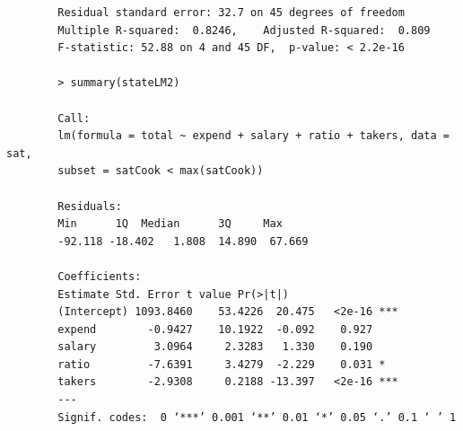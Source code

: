 \documentclass[11pt]{article}
\begin{document}
\begin{enumerate}
\begin{verbatim}
		Residual standard error: 32.7 on 45 degrees of freedom
		Multiple R-squared:  0.8246,	Adjusted R-squared:  0.809 
		F-statistic: 52.88 on 4 and 45 DF,  p-value: < 2.2e-16
		
		> summary(stateLM2)
		
		Call:
		lm(formula = total ~ expend + salary + ratio + takers, data = sat, 
		subset = satCook < max(satCook))
		
		Residuals:
		Min      1Q  Median      3Q     Max 
		-92.118 -18.402   1.808  14.890  67.669 
		
		Coefficients:
		Estimate Std. Error t value Pr(>|t|)    
		(Intercept) 1093.8460    53.4226  20.475   <2e-16 ***
		expend        -0.9427    10.1922  -0.092    0.927    
		salary         3.0964     2.3283   1.330    0.190    
		ratio         -7.6391     3.4279  -2.229    0.031 *  
		takers        -2.9308     0.2188 -13.397   <2e-16 ***
		---
		Signif. codes:  0 ‘***’ 0.001 ‘**’ 0.01 ‘*’ 0.05 ‘.’ 0.1 ‘ ’ 1
		

\end{verbatim}
\end{enumerate}
\end{document}
